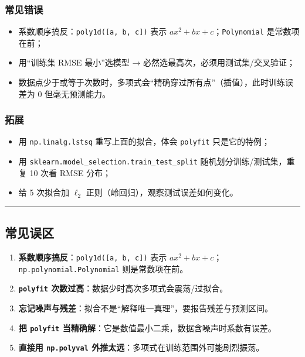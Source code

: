 \subsubsection{常见错误}\label{ux5e38ux89c1ux9519ux8bef-8}

\begin{itemize}
\tightlist
\item
  系数顺序搞反：\texttt{poly1d({[}a,\ b,\ c{]})} 表示
  \(a x^2 + b x + c\)；\texttt{Polynomial} 是常数项在前；
\item
  用``训练集 RMSE 最小''选模型 → 必然选最高次，必须用测试集/交叉验证；
\item
  数据点少于或等于次数时，多项式会``精确穿过所有点''（插值），此时训练误差为
  0 但毫无预测能力。
\end{itemize}

\subsubsection{拓展}\label{ux62d3ux5c55-8}

\begin{itemize}
\tightlist
\item
  用 \texttt{np.linalg.lstsq} 重写上面的拟合，体会 \texttt{polyfit}
  只是它的特例；
\item
  用 \texttt{sklearn.model\_selection.train\_test\_split}
  随机划分训练/测试集，重复 10 次看 RMSE 分布；
\item
  给 5 次拟合加 \(\ell_2\) 正则（岭回归），观察测试误差如何变化。
\end{itemize}

\begin{center}\rule{0.5\linewidth}{0.5pt}\end{center}

\subsection{常见误区}\label{ux5e38ux89c1ux8befux533a-4}

\begin{enumerate}
\def\labelenumi{\arabic{enumi}.}
\tightlist
\item
  \textbf{系数顺序搞反}：\texttt{poly1d({[}a,\ b,\ c{]})} 表示
  \(a x^2 + b x + c\)；\texttt{np.polynomial.Polynomial}
  则是常数项在前。
\item
  \textbf{\texttt{polyfit} 次数过高}：数据少时高次多项式会震荡/过拟合。
\item
  \textbf{忘记噪声与残差}：拟合不是``解释唯一真理''，要报告残差与预测区间。
\item
  \textbf{把 \texttt{polyfit}
  当精确解}：它是数值最小二乘，数据含噪声时系数有误差。
\item
  \textbf{直接用 \texttt{np.polyval}
  外推太远}：多项式在训练范围外可能剧烈振荡。
\end{enumerate}

